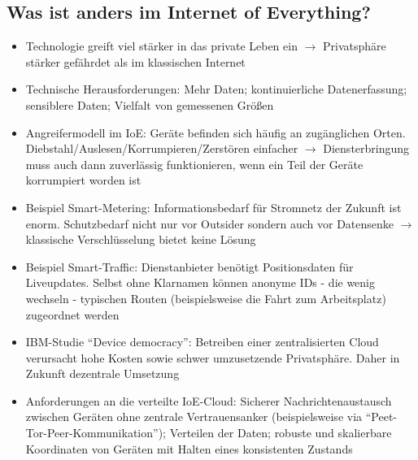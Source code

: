 \subsection{Was ist anders im Internet of Everything?}
\begin{itemize}
	\item Technologie greift viel stärker in das private Leben ein \(\rightarrow\) Privatsphäre stärker gefährdet als im klassischen Internet
	\item Technische Herausforderungen: Mehr Daten; kontinuierliche Datenerfassung; sensiblere Daten; Vielfalt von gemessenen Größen
	\item Angreifermodell im IoE: Geräte befinden sich häufig an zugänglichen Orten. Diebstahl/Auslesen/Korrumpieren/Zerstören einfacher \(\rightarrow\) Diensterbringung muss auch dann zuverlässig funktionieren, wenn ein Teil der Geräte korrumpiert worden ist
	\item Beispiel Smart-Metering: Informationsbedarf für Stromnetz der Zukunft ist enorm. Schutzbedarf nicht nur vor Outsider sondern auch vor Datensenke \(\rightarrow\) klassische Verschlüsselung bietet keine Lösung
	\item Beispiel Smart-Traffic: Dienstanbieter benötigt Positionsdaten für Liveupdates. Selbst ohne Klarnamen können anonyme IDs - die wenig wechseln - typischen Routen (beispielsweise die Fahrt zum Arbeitsplatz) zugeordnet werden
	\item IBM-Studie "`Device democracy"': Betreiben einer zentralisierten Cloud verursacht hohe Kosten sowie schwer umzusetzende Privatsphäre. Daher in Zukunft dezentrale Umsetzung
	\item Anforderungen an die verteilte IoE-Cloud: Sicherer Nachrichtenaustausch zwischen Geräten ohne zentrale Vertrauensanker (beispielsweise via "`Peet-Tor-Peer-Kommunikation"'); Verteilen der Daten; robuste und skalierbare Koordinaten von Geräten mit Halten eines konsistenten Zustands
\end{itemize}


